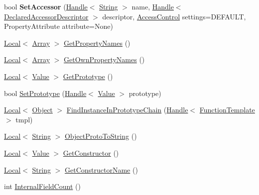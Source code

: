 \begin{DoxyCompactItemize}
\item 
\hypertarget{classv8_1_1_object_abe547da16d4f2d1f964c97ab2e7a6f2e}{}bool {\bfseries Set\+Accessor} (\hyperlink{classv8_1_1_handle}{Handle}$<$ \hyperlink{classv8_1_1_string}{String} $>$ name, \hyperlink{classv8_1_1_handle}{Handle}$<$ \hyperlink{classv8_1_1_declared_accessor_descriptor}{Declared\+Accessor\+Descriptor} $>$ descriptor, \hyperlink{namespacev8_a31d8355cb043d7d2dda3f4a52760b64e}{Access\+Control} settings=D\+E\+F\+A\+U\+L\+T, Property\+Attribute attribute=None)\label{classv8_1_1_object_abe547da16d4f2d1f964c97ab2e7a6f2e}

\item 
\hyperlink{classv8_1_1_local}{Local}$<$ \hyperlink{classv8_1_1_array}{Array} $>$ \hyperlink{classv8_1_1_object_a9f45786246c6e6027b32f685d900a41f}{Get\+Property\+Names} ()
\item 
\hyperlink{classv8_1_1_local}{Local}$<$ \hyperlink{classv8_1_1_array}{Array} $>$ \hyperlink{classv8_1_1_object_aeb48075bdfb7b2b49fe08361a6c4d2a8}{Get\+Own\+Property\+Names} ()
\item 
\hyperlink{classv8_1_1_local}{Local}$<$ \hyperlink{classv8_1_1_value}{Value} $>$ \hyperlink{classv8_1_1_object_ae8d3fed7d6dbd667c29cabb3039fe7af}{Get\+Prototype} ()
\item 
bool \hyperlink{classv8_1_1_object_ab54bbd70d60e62d8bc22a8c8a6be593e}{Set\+Prototype} (\hyperlink{classv8_1_1_handle}{Handle}$<$ \hyperlink{classv8_1_1_value}{Value} $>$ prototype)
\item 
\hyperlink{classv8_1_1_local}{Local}$<$ \hyperlink{classv8_1_1_object}{Object} $>$ \hyperlink{classv8_1_1_object_ab2c5f7369abf08ae8f44dc84f5aa335a}{Find\+Instance\+In\+Prototype\+Chain} (\hyperlink{classv8_1_1_handle}{Handle}$<$ \hyperlink{classv8_1_1_function_template}{Function\+Template} $>$ tmpl)
\item 
\hyperlink{classv8_1_1_local}{Local}$<$ \hyperlink{classv8_1_1_string}{String} $>$ \hyperlink{classv8_1_1_object_aeb2f524c806075e5f9032a24afd86869}{Object\+Proto\+To\+String} ()
\item 
\hyperlink{classv8_1_1_local}{Local}$<$ \hyperlink{classv8_1_1_value}{Value} $>$ \hyperlink{classv8_1_1_object_a6265087e94f67370247cbc7beeedac62}{Get\+Constructor} ()
\item 
\hyperlink{classv8_1_1_local}{Local}$<$ \hyperlink{classv8_1_1_string}{String} $>$ \hyperlink{classv8_1_1_object_a7bbe987794658f20a3ec1b68326305e6}{Get\+Constructor\+Name} ()
\item 
int \hyperlink{classv8_1_1_object_aaec28576353eebe6fee113bce2718ecc}{Internal\+Field\+Count} ()

\end{DoxyCompactItemize}

